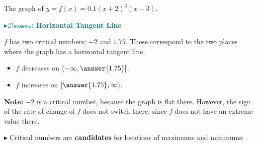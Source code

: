 \documentclass{ximera}
\begin{document}
\begin{example}

The graph of $y = f(x) = 0.1(x+2)^3(x-3)$.




\begin{onlineOnly}
\textbf{\textcolor{teal}{$\blacktriangleright \mathcal{Desmos}$: Horizontal Tangent Line}} 
\begin{center}
\end{center}

\end{onlineOnly}



$f$ has two critical numbers: $-2$ and $1.75$. These correspond to the two places where the graph has a horizontal tangent line.

\begin{itemize}
\item $f$ decreases on $\left(-\infty, \answer{1.75}\right]$.
\item $f$ increases on $\left[\answer{1.75}, \infty\right)$.
\end{itemize}




\end{example}



\textbf{Note:} $-2$ is a critical number, because the graph is flat there.  However, the sign of the rate of change of $f$ does not switch there, since $f$ does not have an extreme value there.

\textbf{\textcolor{red!70!black}{$\blacktriangleright$}} Critical numbers are \textbf{candidates} for locations of maximums and minimums.
\end{document}
